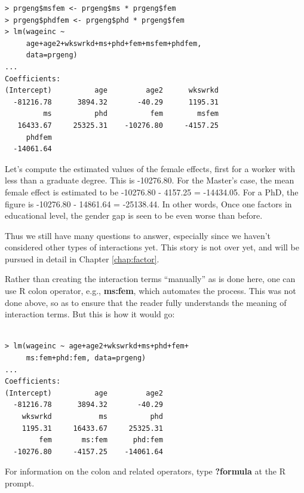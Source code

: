 \begin{lstlisting}
> prgeng$msfem <- prgeng$ms * prgeng$fem
> prgeng$phdfem <- prgeng$phd * prgeng$fem
> lm(wageinc ~ 
     age+age2+wkswrkd+ms+phd+fem+msfem+phdfem,
     data=prgeng)
...
Coefficients:
(Intercept)          age         age2      wkswrkd  
  -81216.78      3894.32       -40.29      1195.31  
         ms          phd          fem        msfem  
   16433.67     25325.31    -10276.80     -4157.25  
     phdfem  
  -14061.64  
\end{lstlisting}

Let's compute the  estimated values of the female effects, first for a
worker with less than a graduate degree.  This is -10276.80.  For the
Master's case, the mean female effect is estimated to be  -10276.80 -
4157.25 = -14434.05.  For a PhD, the figure is -10276.80 - 14861.64 =
-25138.44.  In other words, Once one factors in educational level, the
gender gap is seen to be even worse than before.

Thus we still have many questions to answer, especially since we haven't
considered other types of interactions yet.  This story is not over yet,
and will be pursued in detail in Chapter \ref{chap:factor}.

Rather than creating the interaction terms ``manually'' as is done here,
one can use R colon operator, e.g., {\bf ms:fem}, which automates the
process.  This was not done above, so as to ensure that the reader fully
understands the meaning of interaction terms.  But this is how it would
go:

\begin{lstlisting}

> lm(wageinc ~ age+age2+wkswrkd+ms+phd+fem+
     ms:fem+phd:fem, data=prgeng)
...
Coefficients:
(Intercept)          age         age2  
  -81216.78      3894.32       -40.29  
    wkswrkd           ms          phd  
    1195.31     16433.67     25325.31  
        fem       ms:fem      phd:fem  
  -10276.80     -4157.25    -14061.64  
\end{lstlisting}

For information on the colon and related operators, type {\bf ?formula}
at the R prompt.


